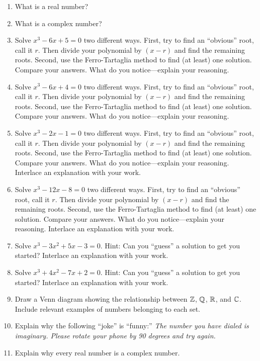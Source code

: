 \begin{problems}
\begin{enumerate}
\item What is a real number?
\item What is a complex number?
\item Solve $x^3-6x+5 = 0$ two different ways. First, try to find an
  ``obvious'' root, call it $r$. Then divide your polynomial by
  $(x-r)$ and find the remaining roots. Second, use the
  Ferro-Tartaglia method to find (at least) one solution. Compare your
  answers. What do you notice---explain your reasoning.
\item Solve $x^3-6x+4 = 0$ two different ways. First, try to find an
  ``obvious'' root, call it $r$. Then divide your polynomial by
  $(x-r)$ and find the remaining roots. Second, use the
  Ferro-Tartaglia method to find (at least) one solution. Compare your
  answers. What do you notice---explain your reasoning.
\item Solve $x^3-2x-1 = 0$ two different ways. First, try to find an
  ``obvious'' root, call it $r$. Then divide your polynomial by
  $(x-r)$ and find the remaining roots. Second, use the
  Ferro-Tartaglia method to find (at least) one solution. Compare your
  answers. What do you notice---explain your reasoning.  Interlace an
  explanation with your work.
\item Solve $x^3-12x-8 = 0$ two different ways. First, try to find an
  ``obvious'' root, call it $r$. Then divide your polynomial by
  $(x-r)$ and find the remaining roots. Second, use the
  Ferro-Tartaglia method to find (at least) one solution. Compare your
  answers. What do you notice---explain your reasoning.  Interlace an
  explanation with your work.
\item Solve $x^3-3x^2+5x-3 = 0$. Hint: Can you ``guess'' a solution to
  get you started?  Interlace an explanation with your work.
\item Solve $x^3+4x^2-7x+2 = 0$. Hint: Can you ``guess'' a solution to
  get you started?  Interlace an explanation with your work.
\item Draw a Venn diagram showing the relationship between $\mathbb Z$, $\mathbb Q$,
  $\mathbb{R}$, and $\mathbb C$. Include relevant examples of numbers belonging to
  each set.
\item Explain why the following ``joke'' is ``funny:'' \textit{The
  number you have dialed is imaginary. Please rotate your phone by 90
  degrees and try again.}
\item Explain why every real number is a complex number.

\end{enumerate}
\end{problems}
